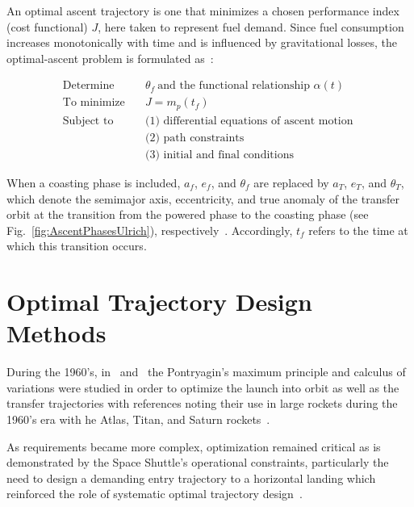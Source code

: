 An optimal ascent trajectory is one that minimizes a chosen performance index (cost functional) $J$, here taken to represent fuel demand. Since fuel consumption increases monotonically with time and is influenced by gravitational losses, the optimal-ascent problem is formulated as~\cite{Ulrich}:

\begin{equation}
\label{eq:optimal_ascent_problem}
\begin{aligned}
\text{Determine} \quad & \theta_f \ \text{and the functional relationship } \alpha(t) \\
\text{To minimize} \quad & J = m_p(t_f) \\
\text{Subject to} \quad
& \text{(1) differential equations of ascent motion } \\
& \text{(2) path constraints} \\
& \text{(3) initial and final conditions}
\end{aligned}
\end{equation}

When a coasting phase is included, $a_f$, $e_f$, and $\theta_f$ are replaced by $a_T$, $e_T$, and $\theta_T$, which denote the semimajor axis, eccentricity, and true anomaly of the transfer orbit at the transition from the powered phase to the coasting phase (see Fig.~\ref{fig:AscentPhasesUlrich}), respectively~\cite{Ulrich}. Accordingly, $t_f$ refers to the time at which this transition occurs.


\section{Optimal Trajectory Design Methods}

During the 1960's, in~\cite{bryson1958optimum} and~\cite{Lawden} the Pontryagin’s maximum principle and calculus of variations were studied in order to optimize the launch into orbit as well as the transfer trajectories with references noting their use in large rockets during the 1960's era with he Atlas, Titan, and Saturn rockets~\cite{brusch1976trajectory}.

As requirements became more complex, optimization remained critical as is demonstrated by the Space Shuttle's operational constraints, particularly the need to design a demanding entry trajectory to a horizontal landing which reinforced the role of systematic optimal trajectory design~\cite{BollinoNavalOptim}.

